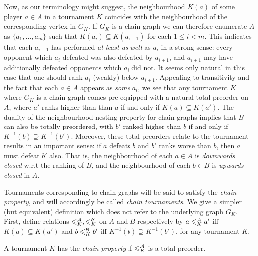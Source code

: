 Now, as our terminology might suggest, the neighbourhood $K(a)$ of some player
$a \in A$ in a tournament $K$ coincides with the neighbourhood of the
corresponding vertex in $G_K$. If $G_K$ is a chain graph we can therefore
enumerate $A$ as $\{a_1,\ldots,a_m\}$ such that $K(a_i) \subseteq K(a_{i+1})$
for each $1 \le i < m$. This indicates that each $a_{i+1}$ has performed
\emph{at least as well} as $a_i$ in a strong sense: every opponent which $a_i$
defeated was also defeated by $a_{i+1}$, and $a_{i+1}$ may have additionally
defeated opponents which $a_i$ did not.\footnotemark{} It seems only natural in
this case that one should rank $a_i$ (weakly) below $a_{i+1}$.
%
%
Appealing to transitivity and the fact that each $a \in A$ appears as
\emph{some} $a_i$, we see that any tournament $K$ where $G_K$ is a chain graph
comes pre-equipped with a natural total preorder on $A$, where $a'$ ranks
higher than than $a$ if and only if $K(a) \subseteq K(a')$. The duality of the
neighbourhood-nesting property for chain graphs implies that $B$ can also be
totally preordered, with $b'$ ranked higher than $b$ if and only if $K^{-1}(b)
\supseteq K^{-1}(b')$.\footnotemark{}
%
Moreover, these total preorders relate to the tournament results in an
important sense: if $a$ defeats $b$ and $b'$ ranks worse than $b$, then $a$
must defeat $b'$ also. That is, the neighbourhood of each $a \in A$ is
\emph{downwards closed} w.r.t the ranking of $B$, and the neighbourhood of each
$b \in B$ is \emph{upwards closed} in $A$.


Tournaments corresponding to chain graphs will be said to satisfy the
\emph{chain property}, and will accordingly be called \emph{chain tournaments}.
We give a simpler (but equivalent) definition which does not refer to the
underlying graph $G_K$. First, define relations ${\leqslant^{\mathcal{A}}_K}, {\leqslant^{\mathcal{B}}_K}$ on
$A$ and $B$ respectively by $a \leqslant^{\mathcal{A}}_K a'$ iff $K(a) \subseteq K(a')$ and $b
\leqslant^{\mathcal{B}}_K b'$ iff $K^{-1}(b) \supseteq K^{-1}(b')$, for any tournament $K$.

\begin{definition}%
    A tournament $K$ has the \emph{chain property} if $\leqslant^{\mathcal{A}}_K$ is a total
    preorder.
\end{definition}

